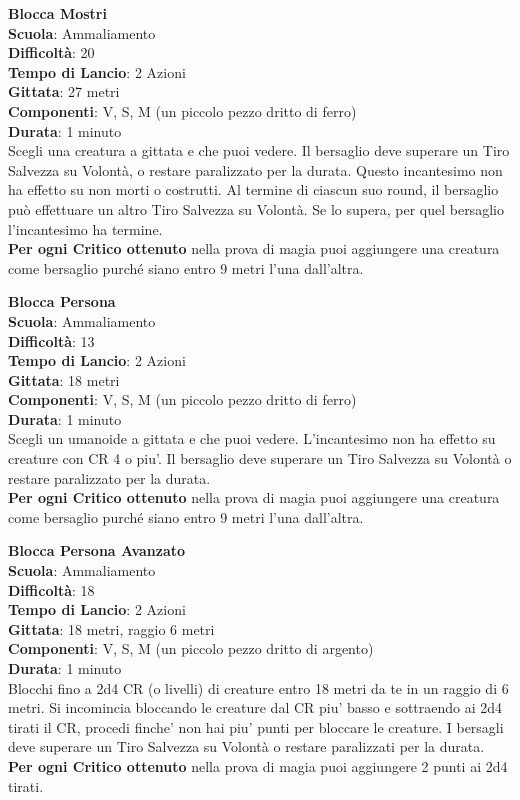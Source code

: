 \begin{multicols}{2}
\medskip\textbf{Blocca Mostri}\\
\textbf{Scuola}: Ammaliamento\\
\textbf{Difficoltà}: 20\\
\textbf{Tempo di Lancio}: 2 Azioni\\
\textbf{Gittata}: 27 metri\\
\textbf{Componenti}: V, S, M (un piccolo pezzo dritto di ferro)\\
\textbf{Durata}: 1 minuto\\
Scegli una creatura a gittata e che puoi vedere. Il bersaglio deve superare un Tiro Salvezza su Volontà, o restare paralizzato per la durata. Questo incantesimo non ha effetto su non morti o costrutti. Al termine di ciascun suo round, il bersaglio può effettuare un altro Tiro Salvezza su Volontà. Se lo supera, per quel bersaglio l'incantesimo ha termine.\\
\textbf{Per ogni Critico ottenuto} nella prova di magia puoi aggiungere una creatura come bersaglio purché siano entro 9 metri l'una dall'altra.

\medskip\textbf{Blocca Persona}\\
\textbf{Scuola}: Ammaliamento\\
\textbf{Difficoltà}: 13\\
\textbf{Tempo di Lancio}: 2 Azioni\\
\textbf{Gittata}: 18 metri\\
\textbf{Componenti}: V, S, M (un piccolo pezzo dritto di ferro)\\
\textbf{Durata}: 1 minuto\\
Scegli un umanoide a gittata e che puoi vedere. L'incantesimo non ha effetto su creature con CR 4 o piu'. Il bersaglio deve superare un Tiro Salvezza su Volontà o restare paralizzato per la durata.\\
\textbf{Per ogni Critico ottenuto} nella prova di magia puoi aggiungere una creatura come bersaglio purché siano entro 9 metri l'una dall'altra.

\medskip\textbf{Blocca Persona Avanzato}\\
\textbf{Scuola}: Ammaliamento\\
\textbf{Difficoltà}: 18\\
\textbf{Tempo di Lancio}: 2 Azioni\\
\textbf{Gittata}: 18 metri, raggio 6 metri\\
\textbf{Componenti}: V, S, M (un piccolo pezzo dritto di argento)\\
\textbf{Durata}: 1 minuto\\
Blocchi fino a 2d4 CR (o livelli) di creature entro 18 metri da te in un raggio di 6 metri. Si incomincia bloccando le creature dal CR piu' basso e sottraendo ai 2d4 tirati il CR, procedi finche' non hai piu' punti per bloccare le creature. I bersagli deve superare un Tiro Salvezza su Volontà o restare paralizzati per la durata.\\
\textbf{Per ogni Critico ottenuto} nella prova di magia puoi aggiungere 2 punti ai 2d4 tirati.


\end{multicols}

